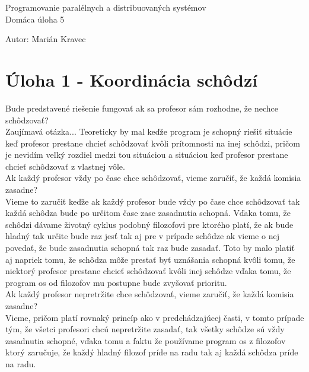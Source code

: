 \documentclass[a4paper]{article}
\begin{document}
 
	
\pagestyle{plain}

\begin{center}
	\sc\large
	Programovanie paralélnych a distribuovaných systémov\\
	Domáca úloha 5
\end{center}

Autor: Marián Kravec

\section{Úloha 1 - Koordinácia schôdzí}

Bude predstavené riešenie fungovať ak sa profesor sám rozhodne, že nechce
schôdzovať?
\\

Zaujímavá otázka... Teoreticky by mal keďže program je schopný riešiť situácie keď profesor prestane chcieť schôdzovať kvôli prítomnosti na inej schôdzi, pričom je nevidím veľký rozdiel medzi tou situáciou a situáciou keď profesor prestane chcieť schôdzovať z vlastnej vôle.
\\

Ak každý profesor vždy po čase chce schôdzovať, vieme zaručiť, že každá komisia
zasadne?
\\

Vieme to zaručiť keďže ak každý profesor bude vždy po čase chce schôdzovať tak každá schôdza bude po určitom čase zase zasadnutia schopná. Vďaka tomu, že schôdzi dávame životný cyklus podobný filozofovi pre ktorého platí, že ak bude hladný tak určite bude raz jesť tak aj pre v prípade schôdze ak vieme o nej povedať, že bude zasadnutia schopná tak raz bude zasadať. Toto by malo platiť aj napriek tomu, že schôdza môže prestať byť uznášania schopná kvôli tomu, že niektorý profesor prestane chcieť schôdzovať kvôli inej schôdze vďaka tomu, že program os od filozofov mu postupne bude zvyšovať prioritu.
\\

Ak každý profesor nepretržite chce schôdzovať, vieme zaručiť, že každá komisia
zasadne? 
\\

Vieme, pričom platí rovnaký princíp ako v predchádzajúcej časti, v tomto prípade tým, že všetci profesori chcú nepretržite zasadať, tak všetky schôdze sú vždy zasadnutia schopné, vďaka tomu a faktu že používame program os z filozofov ktorý zaručuje, že každý hladný filozof príde na radu tak aj každá schôdza príde na radu.
\end{document}
